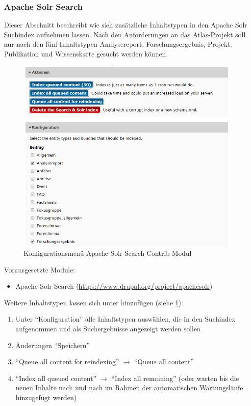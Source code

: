 \subsubsection{Apache Solr Search}\label{subsub:apachesolr}
Dieser Abschnitt beschreibt wie sich zusätzliche Inhaltstypen in den Apache Solr Suchindex aufnehmen lassen. Nach den Anforderungen an das Atlas-Projekt soll nur nach den fünf Inhaltstypen Analysereport, Forschungsergebnis, Projekt, Publikation und Wissenskarte gesucht werden können. 

\begin{figure}[H]
	\centering
	\includegraphics[height=0.20\textheight]{images/config_apachesolr}
	\caption{Konfigurationsmenü Apache Solr Search Contrib Modul}
	\label{fig:config_apachesolr}
\end{figure}

Vorausgesetzte Module:
\begin{itemize}
	\item Apache Solr Search (\url{https://www.drupal.org/project/apachesolr})
\end{itemize}

Weitere Inhaltstypen lassen sich unter  hinzufügen (siehe \cref{fig:config_apachesolr}):
\begin{enumerate}[parsep=0pt, itemsep=5.0pt plus 2.0pt minus 1.0pt]
	\item Unter \enquote{Konfiguration} alle Inhaltstypen auswählen, die in den Suchindex aufgenommen und als Suchergebnisse angezeigt werden sollen
	\item Änderungen \enquote{Speichern}
	\item \enquote{Queue all content for reindexing} $\rightarrow$ \enquote{Queue all content}
	\item \enquote{Index all queued content} $\rightarrow$ \enquote{Index all remaining} (oder warten bis die neuen Inhalte nach und nach im Rahmen der automatischen Wartungsläufe hinzugefügt werden)
\end{enumerate}





